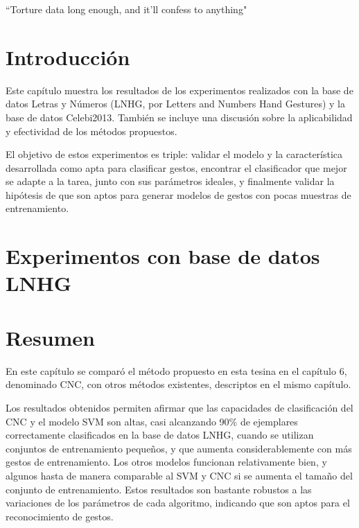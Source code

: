 \epigraph{``Torture data long enough, and it'll confess to anything"}{}


 
\section{Introducción}
 
Este capítulo muestra los resultados de los experimentos realizados con la base de datos Letras y Números (LNHG, por Letters and Numbers Hand Gestures) y la base de datos Celebi2013. También se incluye una discusión sobre la aplicabilidad y efectividad de los métodos propuestos.

El objetivo de estos experimentos es triple: validar el modelo y la característica desarrollada como apta para clasificar gestos, encontrar el clasificador que mejor se adapte a la tarea, junto con sus parámetros ideales, y finalmente validar la hipótesis de que son aptos para generar modelos de gestos con pocas muestras de entrenamiento.


\section{Experimentos con base de datos LNHG}
\label{sec:experimentos}


\section{Resumen}

En este capítulo se comparó el método propuesto en esta tesina en el capítulo 6, denominado CNC, con otros métodos existentes, descriptos en el mismo capítulo.

Los resultados obtenidos permiten afirmar que las capacidades de clasificación del CNC y el modelo SVM son altas, casi alcanzando 90\% de ejemplares correctamente clasificados en la base de datos LNHG, cuando se utilizan conjuntos de entrenamiento pequeños, y que aumenta considerablemente con más gestos de entrenamiento. Los otros modelos funcionan relativamente bien, y algunos hasta de manera comparable al SVM y CNC si se aumenta el tamaño del conjunto de entrenamiento. Estos resultados son bastante robustos a las variaciones de los parámetros de cada algoritmo, indicando que son aptos para el reconocimiento de gestos.
